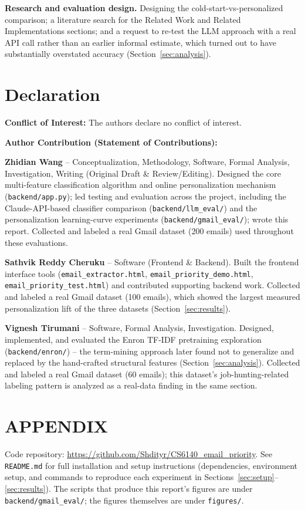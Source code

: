 \documentclass[twoside,twocolumn,10pt]{article}
\begin{document}
\textbf{Research and evaluation design.} Designing the cold-start-vs-personalized comparison; a literature search for the Related Work and Related Implementations sections; and a request to re-test the LLM approach with a real API call rather than an earlier informal estimate, which turned out to have substantially overstated accuracy (Section~\ref{sec:analysis}).

\section{Declaration}
\fontsize{11}{13}\selectfont

\textbf{Conflict of Interest:} The authors declare no conflict of interest.

\textbf{Author Contribution (Statement of Contributions):}

\textbf{Zhidian Wang} -- Conceptualization, Methodology, Software, Formal Analysis, Investigation, Writing (Original Draft \& Review/Editing). Designed the core multi-feature classification algorithm and online personalization mechanism (\texttt{backend/app.py}); led testing and evaluation across the project, including the Claude-API-based classifier comparison (\texttt{backend/llm\_eval/}) and the personalization learning-curve experiments (\texttt{backend/gmail\_eval/}); wrote this report. Collected and labeled a real Gmail dataset (200 emails) used throughout these evaluations.

\textbf{Sathvik Reddy Cheruku} -- Software (Frontend \& Backend). Built the frontend interface tools (\texttt{email\_extractor.html}, \texttt{email\_priority\_demo.html}, \texttt{email\_priority\_test.html}) and contributed supporting backend work. Collected and labeled a real Gmail dataset (100 emails), which showed the largest measured personalization lift of the three datasets (Section~\ref{sec:results}).

\textbf{Vignesh Tirumani} -- Software, Formal Analysis, Investigation. Designed, implemented, and evaluated the Enron TF-IDF pretraining exploration (\texttt{backend/enron/}) -- the term-mining approach later found not to generalize and replaced by the hand-crafted structural features (Section~\ref{sec:analysis}). Collected and labeled a real Gmail dataset (60 emails); this dataset's job-hunting-related labeling pattern is analyzed as a real-data finding in the same section.

\printbibliography

\section*{\MakeUppercase{Appendix}}
\fontsize{11}{13}\selectfont

Code repository: \url{https://github.com/Shdityr/CS6140_email_priority}. See \texttt{README.md} for full installation and setup instructions (dependencies, environment setup, and commands to reproduce each experiment in Sections~\ref{sec:setup}--\ref{sec:results}). The scripts that produce this report's figures are under \texttt{backend/gmail\_eval/}; the figures themselves are under \texttt{figures/}.
\end{document}
